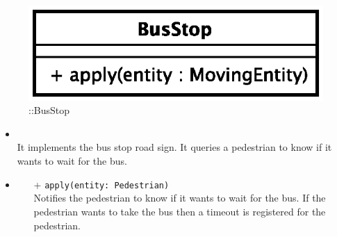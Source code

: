 \begin{figure}[h]
\centering
\includegraphics[scale=0.6,keepaspectratio]{images/solution/bus_stop.eps}
\caption{\pPassive::BusStop}
\label{fig:sd-app-bus_stop}
\end{figure}
\FloatBarrier
\begin{itemize}
  \item \textbf{\descr} \\
It implements the bus stop road sign. It queries a pedestrian to know if it wants to wait for the bus.
  \item \textbf{\ops}
  \begin{itemize} 
  \item[+] \texttt{apply(entity: Pedestrian)} \\
Notifies the pedestrian to know if it wants to wait for the bus. If the pedestrian wants
to take the bus then a timeout is registered for the pedestrian.
  \end{itemize}
\end{itemize}
